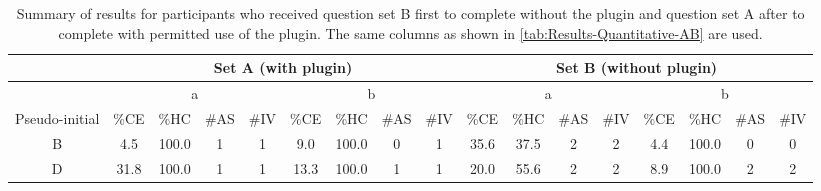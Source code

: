 \begin{landscape}
  \begin{table}[p]
    \caption{
      Summary of results for participants who received question set B first to complete without the plugin and question set A after to complete with permitted use of the plugin.
      The same columns as shown in \autoref{tab:Results-Quantitative-AB} are used.
    }
    \begin{tabular}{@{}ccccccccccccccccc@{}}
      \toprule
      \multicolumn{1}{l}{}                & \multicolumn{8}{c}{Set A (with plugin)}                                                                                                                      & \multicolumn{8}{c}{Set B (without plugin)}                                                                                                                                                         \\ \midrule
      \multicolumn{1}{c|}{}               & \multicolumn{4}{c|}{a}                          & \multicolumn{4}{c|}{b}                                                                                     & \multicolumn{4}{c|}{a}                                                                 & \multicolumn{4}{c}{b}                                                                                     \\ \midrule
      \multicolumn{1}{c|}{Pseudo-initial} & \%CE & \%HC  & \#AS & \multicolumn{1}{l|}{\#IV} & \multicolumn{1}{l}{\%CE} & \multicolumn{1}{l}{\%HC} & \multicolumn{1}{l}{\#AS} & \multicolumn{1}{l|}{\#IV} & \%CE & \multicolumn{1}{l}{\%HC} & \multicolumn{1}{l}{\#AS} & \multicolumn{1}{l|}{\#IV} & \multicolumn{1}{l}{\%CE} & \multicolumn{1}{l}{\%HC} & \multicolumn{1}{l}{\#AS} & \multicolumn{1}{l}{\#IV} \\ \midrule
      \multicolumn{1}{c|}{B}              & 4.5  & 100.0 & 1    & \multicolumn{1}{c|}{1}    & 9.0                      & 100.0                    & 0                        & \multicolumn{1}{c|}{1}    & 35.6 & 37.5                     & 2                        & \multicolumn{1}{c|}{2}    & 4.4                      & 100.0                    & 0                        & 0                        \\
      \multicolumn{1}{c|}{D}              & 31.8 & 100.0 & 1    & \multicolumn{1}{c|}{1}    & 13.3                     & 100.0                    & 1                        & \multicolumn{1}{c|}{1}    & 20.0 & 55.6                     & 2                        & \multicolumn{1}{c|}{2}    & 8.9                      & 100.0                    & 2                        & 2                        \\

\end{tabular}
\end{table}
\end{landscape}
